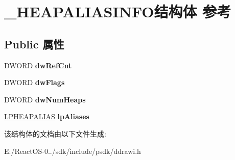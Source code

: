 \hypertarget{struct___h_e_a_p_a_l_i_a_s_i_n_f_o}{}\section{\+\_\+\+H\+E\+A\+P\+A\+L\+I\+A\+S\+I\+N\+F\+O结构体 参考}
\label{struct___h_e_a_p_a_l_i_a_s_i_n_f_o}
\subsection*{Public 属性}
\begin{DoxyCompactItemize}
\item 
\mbox{\label{struct___h_e_a_p_a_l_i_a_s_i_n_f_o_abc321d02bbbeaa39e7eeb8405dc236c0}} 
D\+W\+O\+RD {\bfseries dw\+Ref\+Cnt}
\item 
\mbox{\label{struct___h_e_a_p_a_l_i_a_s_i_n_f_o_ad4278aa279b2b1c5707a52521ba7d65d}} 
D\+W\+O\+RD {\bfseries dw\+Flags}
\item 
\mbox{\label{struct___h_e_a_p_a_l_i_a_s_i_n_f_o_ab01581e4aaa465499d916fa355ef389c}} 
D\+W\+O\+RD {\bfseries dw\+Num\+Heaps}
\item 
\mbox{\label{struct___h_e_a_p_a_l_i_a_s_i_n_f_o_aac007b91588be6db84c3aa24b3b6e269}} 
\hyperlink{struct___h_e_a_p_a_l_i_a_s}{L\+P\+H\+E\+A\+P\+A\+L\+I\+AS} {\bfseries lp\+Aliases}
\end{DoxyCompactItemize}


该结构体的文档由以下文件生成\+:\begin{DoxyCompactItemize}
\item 
E\+:/\+React\+O\+S-\/0../sdk/include/psdk/ddrawi.\+h\end{DoxyCompactItemize}
